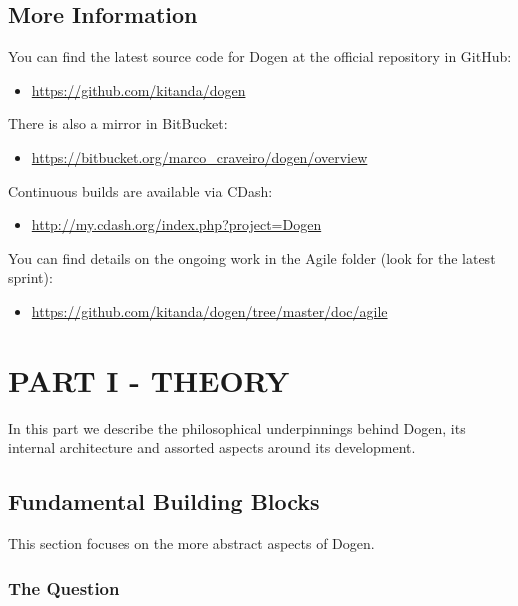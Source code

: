 \documentclass[11pt]{article}
\begin{document}
\subsection{More Information}
\label{sec-1-2}

You can find the latest source code for Dogen at the official
repository in GitHub:

\begin{itemize}
\item \url{https://github.com/kitanda/dogen}
\end{itemize}

There is also a mirror in BitBucket:

\begin{itemize}
\item \url{https://bitbucket.org/marco_craveiro/dogen/overview}
\end{itemize}

Continuous builds are available via CDash:

\begin{itemize}
\item \url{http://my.cdash.org/index.php?project=Dogen}
\end{itemize}

You can find details on the ongoing work in the Agile folder (look for
the latest sprint):

\begin{itemize}
\item \url{https://github.com/kitanda/dogen/tree/master/doc/agile}
\end{itemize}

\section{PART I - THEORY}
\label{sec-2}

In this part we describe the philosophical underpinnings behind Dogen,
its internal architecture and assorted aspects around its development.

\subsection{Fundamental Building Blocks}
\label{sec-2-1}

This section focuses on the more abstract aspects of Dogen.

\subsubsection{The Question}
\label{sec-2-1-1}
\end{document}
